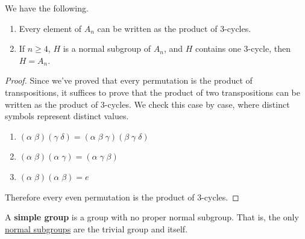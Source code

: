  \begin{lemma}
    \label{thm:cycles_alt}
    We have the following. 
    \begin{enumerate}
      \item Every element of $A_n$ can be written as the product of 3-cycles. 
      \item If $n \geq 4$, $H$ is a normal subgroup of $A_n$, and $H$ contains one 3-cycle, then $H = A_n$. 
    \end{enumerate}
  \end{lemma}
  \begin{proof}
    Since we've proved that every permutation is the product of transpositions, it suffices to prove that the product of two transpositions can be written as the product of 3-cycles. We check this case by case, where distinct symbols represent distinct values. 
    \begin{enumerate}
      \item $(\alpha \; \beta) ( \gamma \; \delta) = (\alpha \; \beta \; \gamma) (\beta \; \gamma \; \delta)$ 
      \item $(\alpha \; \beta)(\alpha \; \gamma) = (\alpha \; \gamma \; \beta)$ 
      \item $(\alpha \; \beta) (\alpha \; \beta) = e$
    \end{enumerate}
    Therefore every even permutation is the product of 3-cycles. 
  \end{proof}

  \begin{definition}
    \label{def:simple-group}
    A \textbf{simple group} is a group with no proper normal subgroup. That is, the only \hyperref[def:normal_subgroup]{normal subgroups} are the trivial group and itself. 
  \end{definition}

